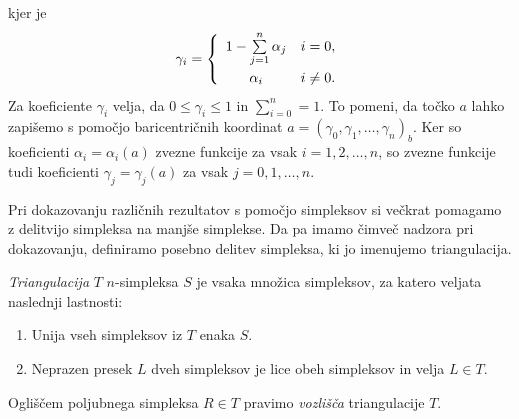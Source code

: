 \documentclass[mat1]{fmfdelo}
\newcommand{\0}{\underline{0}}
\begin{document}
\begin{dokaz}
kjer je
\[  \gamma_i =  \left\{
\begin{array}{cl}\vspace{3pt}
	1 -\sum\limits_{j=1}^n \alpha_j & i = 0,\\
	\alpha_i & i \neq 0. \\
\end{array} 
\right. \]
Za koeficiente $\gamma_i$ velja, da $0 \leq \gamma_i \leq 1$ in $\sum\limits_{i=0}^n = 1$. To pomeni, da točko $a$ lahko zapišemo s pomočjo baricentričnih koordinat $a = (\gamma_0, \gamma_1, \dots, \gamma_n)_b$. Ker so koeficienti $\alpha_i = \alpha_i(a)$ zvezne funkcije za vsak $i = 1, 2, \dots, n$, so zvezne funkcije tudi koeficienti $\gamma_j = \gamma_j(a)$ za vsak $j = 0, 1, \dots, n$.
\end{dokaz}
Pri dokazovanju različnih rezultatov s pomočjo simpleksov si večkrat pomagamo z delitvijo simpleksa na manjše simplekse. Da pa imamo čimveč nadzora pri dokazovanju, definiramo posebno delitev simpleksa, ki jo imenujemo triangulacija.

\begin{definicija}
\emph{Triangulacija} $T$ $n$-simpleksa $S$ je vsaka množica simpleksov, za katero veljata naslednji lastnosti:
\begin{enumerate}
\item Unija vseh simpleksov iz $T$ enaka $S$.
\item Neprazen presek $L$ dveh simpleksov je lice obeh simpleksov in velja $L \in T$.
\end{enumerate}
Ogliščem poljubnega simpleksa $R \in T$ pravimo \emph{vozlišča} triangulacije $T$.
\end{definicija}
\end{document}
